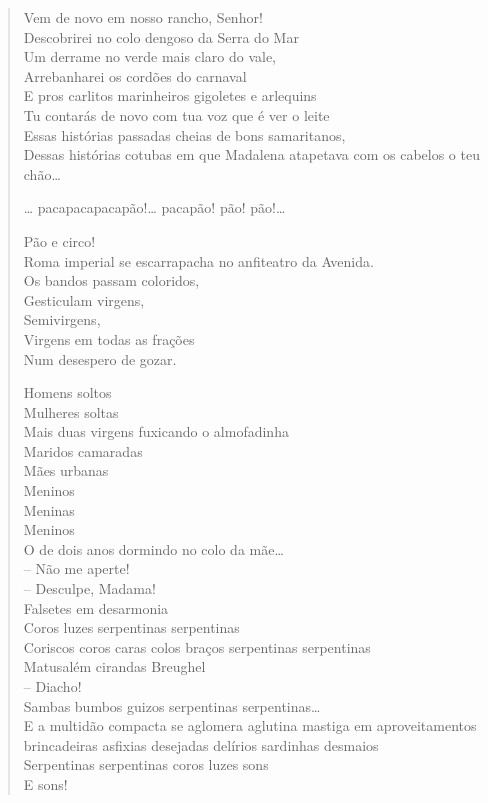 \begin{verse}
Vem de novo em nosso rancho, Senhor!\\
Descobrirei no colo dengoso da Serra do Mar\\
Um derrame no verde mais claro do vale,\\
Arrebanharei os cordões do carnaval\\
E pros carlitos marinheiros gigoletes e arlequins\\
Tu contarás de novo com tua voz que é ver o leite\\
Essas histórias passadas cheias de bons samaritanos,\\
Dessas histórias cotubas em que Madalena atapetava com os cabelos o teu chão\ldots{}

\ldots{} pacapacapacapão!\ldots{} pacapão! pão! pão!\ldots{}

Pão e circo!\\
Roma imperial se escarrapacha no anfiteatro da Avenida.\\
Os bandos passam coloridos,\\
Gesticulam virgens,\\
Semivirgens,\\
Virgens em todas as frações\\
Num desespero de gozar.

Homens soltos\\
Mulheres soltas\\
Mais duas virgens fuxicando o almofadinha\\
Maridos camaradas\\
Mães urbanas\\
Meninos\\
Meninas\\
Meninos\\
O de dois anos dormindo no colo da mãe\ldots{}\\
-- Não me aperte!\\
\qquad\qquad -- Desculpe, Madama!\\
Falsetes em desarmonia\\
Coros luzes serpentinas serpentinas\\
Coriscos coros caras colos braços serpentinas serpentinas\\
Matusalém cirandas Breughel\\
\qquad\qquad\qquad\qquad\qquad -- Diacho!\\
Sambas bumbos guizos serpentinas serpentinas\ldots{}\\
E a multidão compacta se aglomera aglutina mastiga em aproveitamentos brincadeiras asfixias desejadas delírios sardinhas desmaios\\
Serpentinas serpentinas coros luzes sons\\
E sons!\\


\end{verse}
